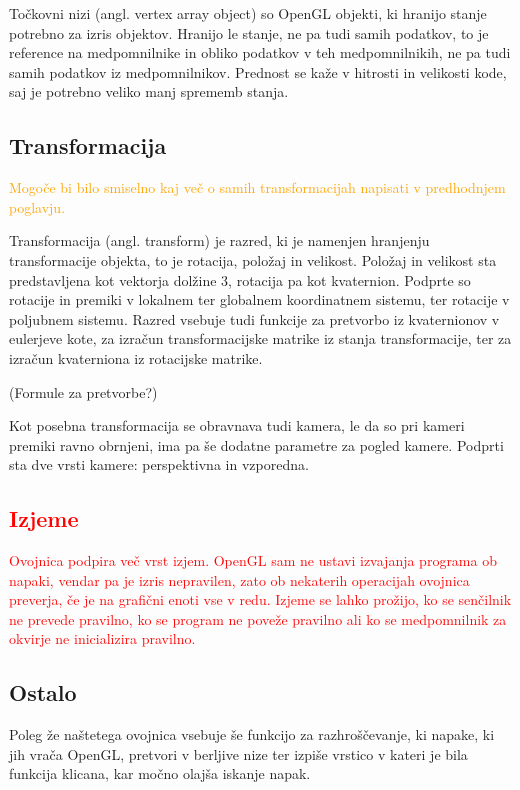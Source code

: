 \documentclass[a4paper, 12pt]{book}
\begin{document}
Točkovni nizi (angl. vertex array object) so OpenGL objekti, ki hranijo stanje potrebno za izris objektov. Hranijo le stanje, ne pa tudi samih podatkov, to je reference na medpomnilnike in obliko podatkov v teh medpomnilnikih, ne pa tudi samih podatkov iz medpomnilnikov. Prednost se kaže v hitrosti in velikosti kode, saj je potrebno veliko manj sprememb stanja.

\subsection*{Transformacija}

\textcolor{orange}{Mogoče bi bilo smiselno kaj več o samih transformacijah napisati v predhodnjem poglavju.}

Transformacija (angl. transform) je razred, ki je namenjen hranjenju transformacije objekta, to je rotacija, položaj in velikost. Položaj in velikost sta predstavljena kot vektorja dolžine 3, rotacija pa kot kvaternion. Podprte so rotacije in premiki v lokalnem ter globalnem koordinatnem sistemu, ter rotacije v poljubnem sistemu. Razred vsebuje tudi funkcije za pretvorbo iz kvaternionov v eulerjeve kote, za izračun transformacijske matrike iz stanja transformacije, ter za izračun kvaterniona iz rotacijske matrike.

(Formule za pretvorbe?)

Kot posebna transformacija se obravnava tudi kamera, le da so pri kameri premiki ravno obrnjeni, ima pa še dodatne parametre za pogled kamere. Podprti sta dve vrsti kamere: perspektivna in vzporedna.
\textcolor{red}{\subsection*{Izjeme}}
\textcolor{red}{Ovojnica podpira več vrst izjem. OpenGL sam ne ustavi izvajanja programa ob napaki, vendar pa je izris nepravilen, zato ob nekaterih operacijah ovojnica preverja, če je na grafični enoti vse v redu. Izjeme se lahko prožijo, ko se senčilnik ne prevede pravilno, ko se program ne poveže pravilno ali ko se medpomnilnik za okvirje ne inicializira pravilno.
}

\subsection*{Ostalo}

Poleg že naštetega ovojnica vsebuje še funkcijo za razhroščevanje, ki napake, ki jih vrača OpenGL, pretvori v berljive nize ter izpiše vrstico v kateri je bila funkcija klicana, kar močno olajša iskanje napak.
\end{document}
